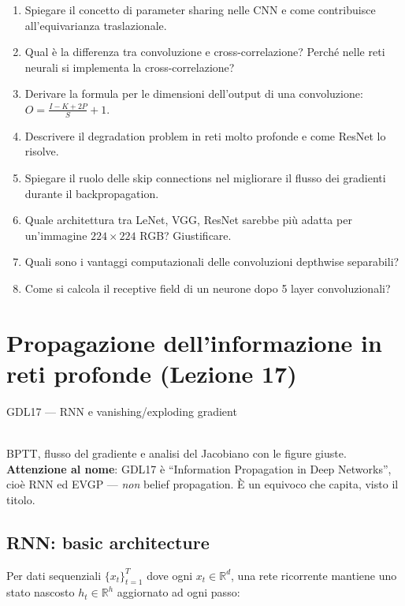 \begin{enumerate}
\item Spiegare il concetto di parameter sharing nelle CNN e come contribuisce all'equivarianza traslazionale.
\item Qual è la differenza tra convoluzione e cross-correlazione? Perché nelle reti neurali si implementa la cross-correlazione?
\item Derivare la formula per le dimensioni dell'output di una convoluzione: $O = \frac{I - K + 2P}{S} + 1$.
\item Descrivere il degradation problem in reti molto profonde e come ResNet lo risolve.
\item Spiegare il ruolo delle skip connections nel migliorare il flusso dei gradienti durante il backpropagation.
\item Quale architettura tra LeNet, VGG, ResNet sarebbe più adatta per un'immagine $224 \times 224$ RGB? Giustificare.
\item Quali sono i vantaggi computazionali delle convoluzioni depthwise separabili?
\item Come si calcola il receptive field di un neurone dopo 5 layer convoluzionali?
\end{enumerate}

\chapter{Propagazione dell'informazione in reti profonde (Lezione 17)}\label{ch:propagation}

\begin{risorsevideo}{GDL17 — RNN e vanishing/exploding gradient}

\medskip
{}\\
BPTT, flusso del gradiente e analisi del Jacobiano con le figure giuste. \textbf{Attenzione al nome}: GDL17 è ``Information Propagation in Deep Networks'', cioè RNN ed EVGP — \emph{non} belief propagation. È un equivoco che capita, visto il titolo.
\end{risorsevideo}

\section{RNN: basic architecture}

Per dati sequenziali $\{x_t\}_{t=1}^{T}$ dove ogni $x_t \in \mathbb{R}^d$, una rete ricorrente mantiene uno stato nascosto $h_t \in \mathbb{R}^h$ aggiornato ad ogni passo:

